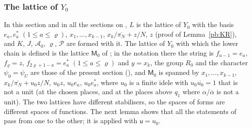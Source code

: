 \documentclass[10pt]{amsart}
\theoremstyle{definition}
\theoremstyle{remark}
\providecommand{\auAz}{\mathcal A_0}
\providecommand{\auP}{\mathcal P}
\providecommand{\aubar}[1]{\overline{#1}}
\begin{document}
\subsubsection*{The lattice of $Y_0$}
In this section and in all the sections on {\cite[Theorem~14.14]{P46}}, $L$ is the lattice of $Y_0$ with the
basis $e_a,e_a^*$ $(1\le a\le\varrho)$, $x_1,\dots,x_{k-1}$, $x_k/\aubar{\pi_N}+z/N$, $z$ (proof of
Lemma~\ref{pb:KR}), and $K$, $J$, $\auAz$, $\varrho$, $\auP$ are formed with it. The lattice of $Y_0$
with which the lower chain is defined is the lattice $\mathsf M_0$ of {\cite[(35)]{P49}}; in the
notation there the string is $f_{a-1}=e_a$, $f_\varrho=z$, $f_{2\varrho+1-a}=e_a^*$ $(1\le a\le\varrho)$
and $y=x_k$, the group $R_0$ and the character $\psi_0=\psi_U$ are those of the present section
({\cite[\S5.1.3]{P49}}), and $\mathsf M_0$ is spanned by $x_1,\dots,x_{k-1}$, $x_k/\aubar{\pi_N}+u_0z/N$,
$u_0z$, $u_0e_a$, $u_0e_a^*$, where $u_0$ is a finite idele with $u_0\aubar{u_0}=1$ that is not a unit
(at the chosen places, and at the places above $q_1$ where $\alpha/\aubar\alpha$ is not a unit). The
two lattices have different stabilisers, so the spaces of forms are different spaces of functions.
The next lemma shows that all the statements of {\cite[Proposition~14.32]{P46}} pass from one to the
other; it is applied with $\mathsf u=u_0$.
\end{document}
